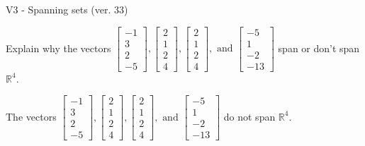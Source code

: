 \begin{exercise}
  \begin{exerciseTitle}V3 - Spanning sets (ver. 33)\end{exerciseTitle}
  \begin{exerciseStatement}
    Explain why the vectors \(\left[\begin{array}{r}
-1 \\
3 \\
2 \\
-5
\end{array}\right] , \left[\begin{array}{r}
2 \\
1 \\
2 \\
4
\end{array}\right] , \left[\begin{array}{r}
2 \\
1 \\
2 \\
4
\end{array}\right] , \text{ and } \left[\begin{array}{r}
-5 \\
1 \\
-2 \\
-13
\end{array}\right]\) span or don't span \(\mathbb{R}^4\). 
	


  \end{exerciseStatement}
  \begin{exerciseAnswer}
   The vectors \(\left[\begin{array}{r}
-1 \\
3 \\
2 \\
-5
\end{array}\right] , \left[\begin{array}{r}
2 \\
1 \\
2 \\
4
\end{array}\right] , \left[\begin{array}{r}
2 \\
1 \\
2 \\
4
\end{array}\right] , \text{ and } \left[\begin{array}{r}
-5 \\
1 \\
-2 \\
-13
\end{array}\right]\) 
  	 do not  
	span \(\mathbb{R}^4\).
  


  \end{exerciseAnswer}
\end{exercise}